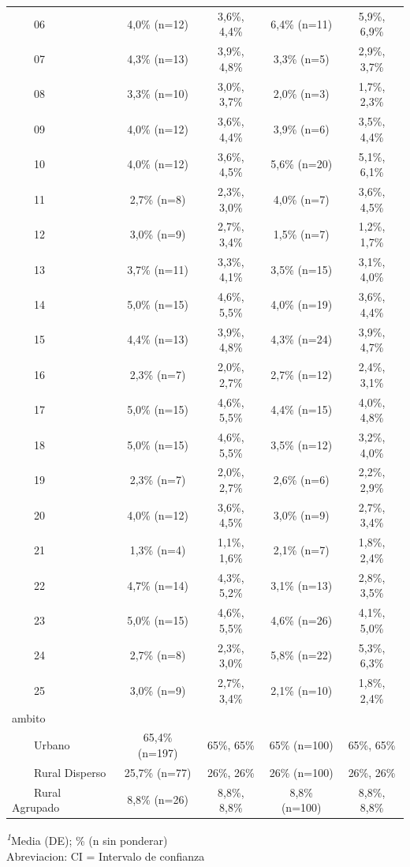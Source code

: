 \documentclass[
  spanish,
  a4paper,
]{scrreprt}
\begin{document}
\begin{table}
{\begin{tabular*}{\linewidth}{@{\extracolsep{\fill}}lcccc}
    06 & 4,0\% (n=12) & 3,6\%, 4,4\% & 6,4\% (n=11) & 5,9\%, 6,9\% \\ 
    07 & 4,3\% (n=13) & 3,9\%, 4,8\% & 3,3\% (n=5) & 2,9\%, 3,7\% \\ 
    08 & 3,3\% (n=10) & 3,0\%, 3,7\% & 2,0\% (n=3) & 1,7\%, 2,3\% \\ 
    09 & 4,0\% (n=12) & 3,6\%, 4,4\% & 3,9\% (n=6) & 3,5\%, 4,4\% \\ 
    10 & 4,0\% (n=12) & 3,6\%, 4,5\% & 5,6\% (n=20) & 5,1\%, 6,1\% \\ 
    11 & 2,7\% (n=8) & 2,3\%, 3,0\% & 4,0\% (n=7) & 3,6\%, 4,5\% \\ 
    12 & 3,0\% (n=9) & 2,7\%, 3,4\% & 1,5\% (n=7) & 1,2\%, 1,7\% \\ 
    13 & 3,7\% (n=11) & 3,3\%, 4,1\% & 3,5\% (n=15) & 3,1\%, 4,0\% \\ 
    14 & 5,0\% (n=15) & 4,6\%, 5,5\% & 4,0\% (n=19) & 3,6\%, 4,4\% \\ 
    15 & 4,4\% (n=13) & 3,9\%, 4,8\% & 4,3\% (n=24) & 3,9\%, 4,7\% \\ 
    16 & 2,3\% (n=7) & 2,0\%, 2,7\% & 2,7\% (n=12) & 2,4\%, 3,1\% \\ 
    17 & 5,0\% (n=15) & 4,6\%, 5,5\% & 4,4\% (n=15) & 4,0\%, 4,8\% \\ 
    18 & 5,0\% (n=15) & 4,6\%, 5,5\% & 3,5\% (n=12) & 3,2\%, 4,0\% \\ 
    19 & 2,3\% (n=7) & 2,0\%, 2,7\% & 2,6\% (n=6) & 2,2\%, 2,9\% \\ 
    20 & 4,0\% (n=12) & 3,6\%, 4,5\% & 3,0\% (n=9) & 2,7\%, 3,4\% \\ 
    21 & 1,3\% (n=4) & 1,1\%, 1,6\% & 2,1\% (n=7) & 1,8\%, 2,4\% \\ 
    22 & 4,7\% (n=14) & 4,3\%, 5,2\% & 3,1\% (n=13) & 2,8\%, 3,5\% \\ 
    23 & 5,0\% (n=15) & 4,6\%, 5,5\% & 4,6\% (n=26) & 4,1\%, 5,0\% \\ 
    24 & 2,7\% (n=8) & 2,3\%, 3,0\% & 5,8\% (n=22) & 5,3\%, 6,3\% \\ 
    25 & 3,0\% (n=9) & 2,7\%, 3,4\% & 2,1\% (n=10) & 1,8\%, 2,4\% \\ 
ambito &  &  &  &  \\ 
    Urbano & 65,4\% (n=197) & 65\%, 65\% & 65\% (n=100) & 65\%, 65\% \\ 
    Rural Disperso & 25,7\% (n=77) & 26\%, 26\% & 26\% (n=100) & 26\%, 26\% \\ 
    Rural Agrupado & 8,8\% (n=26) & 8,8\%, 8,8\% & 8,8\% (n=100) & 8,8\%, 8,8\% \\ 
\bottomrule
\end{tabular*}
\begin{minipage}{\linewidth}
\textsuperscript{\textit{1}}Media (DE); \% (n sin ponderar)\\
Abreviacion: CI = Intervalo de confianza\\
\end{minipage}

}

\end{table}%
\end{document}
